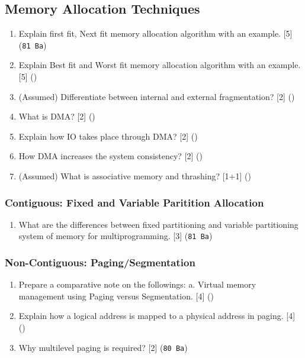 \documentclass[12pt]{article}
\begin{document}
	\subsection{Memory Allocation Techniques}
		\begin{enumerate}
			\item Explain first fit, Next fit memory allocation algorithm with an example. \hfill [5] (\texttt{81 Ba})

			\item Explain Best fit and Worst fit memory allocation algorithm with an example. \hfill [5] ()

			\item (Assumed) Differentiate between internal and external fragmentation? \hfill [2] ()

			\item What is DMA? \hfill [2] ()

			\item Explain how IO takes place through DMA? \hfill [2] ()

			\item How DMA increases the system consistency? \hfill [2] ()

			\item (Assumed) What is associative memory and thrashing? \hfill [1+1] ()
		\end{enumerate}

		\subsubsection{Contiguous: Fixed and Variable Paritition Allocation}
			\begin{enumerate}
				\item What are the differences between fixed partitioning and variable partitioning system of memory for multiprogramming. \hfill [3] (\texttt{81 Ba})
			\end{enumerate}

		\subsubsection{Non-Contiguous: Paging/Segmentation}
			\begin{enumerate}
				\item Prepare a comparative note on the followings: a. Virtual memory management using Paging versus Segmentation. \hfill [4] ()
				
				\item Explain how a logical address is mapped to a physical address in paging. \hfill [4] ()

				\item Why multilevel paging is required? \hfill [2] (\texttt{80 Ba})
			\end{enumerate}
\end{document}
